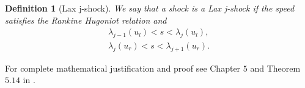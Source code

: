 \documentclass[10pt]{article}
\newtheorem{definition}{Definition}[section]
\numberwithin{equation}{section}
\begin{document}
\begin{definition}[Lax j-shock]
We say that a shock is a Lax j-shock if the speed satisfies the Rankine Hugoniot relation and 
\begin{align*}
    \lambda_{j-1}(u_l) < s < \lambda_{j}(u_l), \\
    \lambda_{j}(u_r) < s < \lambda_{j+1}(u_r).
\end{align*}
\end{definition}
For complete mathematical justification and proof see Chapter $5$ and Theorem $5.14$ in \cite{HoldenH.Helge2015Ftfh}. 

\end{document}
